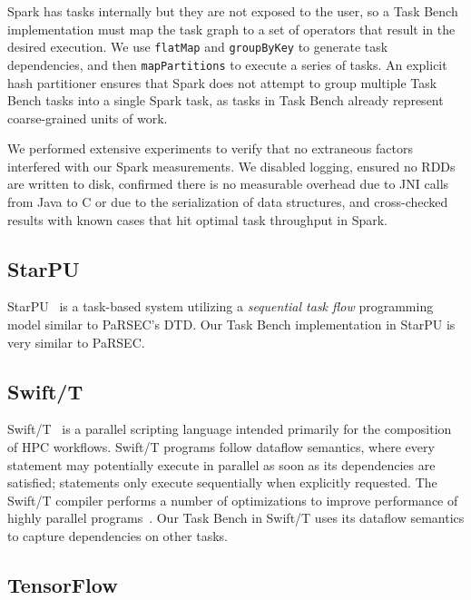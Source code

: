 Spark has tasks internally but they are not exposed to the user,
so a Task Bench implementation must map the task graph to a set of operators that result in the
desired execution. We use
\lstinline[language=Scala]{flatMap} and
\lstinline[language=Scala]{groupByKey} to generate task
dependencies, and then \lstinline[language=Scala]{mapPartitions} to execute a
series of tasks. An explicit hash partitioner ensures that
Spark does not attempt to group multiple Task Bench tasks into a
single Spark task, as tasks in Task Bench already represent coarse-grained units of work.

We performed extensive experiments to verify that no
extraneous factors interfered with our Spark measurements. We
disabled logging, ensured no RDDs are written
to disk, confirmed there is no measurable overhead due to JNI
calls from Java to C or due to the serialization of data structures, and cross-checked results with known cases
that hit optimal task throughput in Spark.

\subsection{StarPU}

StarPU~\cite{StarPU11} is a task-based system utilizing a \emph{sequential task flow}
programming model similar to PaRSEC's DTD. Our Task Bench implementation in
StarPU is very similar to PaRSEC.

\subsection{Swift/T}

Swift/T~\cite{Wozniak13} is a parallel scripting language intended
primarily for the composition of HPC workflows. Swift/T
programs follow dataflow semantics, where every statement may
potentially execute in parallel as soon as its dependencies are
satisfied; statements only execute sequentially when explicitly
requested. The Swift/T compiler performs a number of optimizations to
improve performance of highly parallel programs~\cite{Armstrong14}. 
Our Task Bench in Swift/T uses its dataflow
semantics to capture dependencies on other tasks.

\subsection{TensorFlow}

